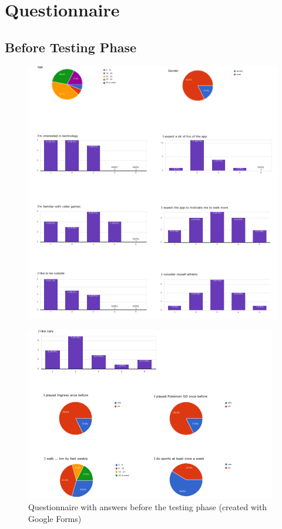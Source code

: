 \chapter{Questionnaire}
\section{Before Testing Phase}
\begin{figure}[btph]
  \centering
        \includegraphics[width=.99\linewidth]{gfx/Evaluation_pre}
        \label{fig:evaluationPre}
\end{figure}

\clearpage

\begin{figure}[btph]
  \centering
        \includegraphics[width=.99\linewidth]{gfx/Evaluation_pre2}
        \caption{Questionnaire with answers before the testing phase (created with Google Forms)}
        \label{fig:evaluationPre2}
\end{figure}

